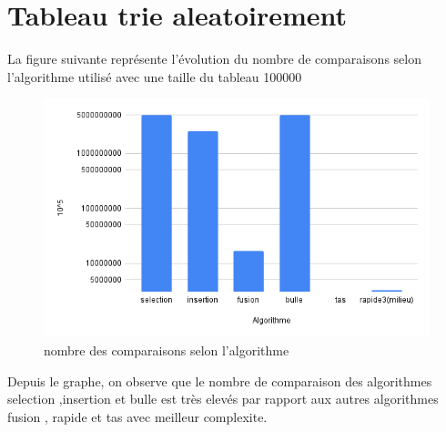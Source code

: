 \section{Tableau trie aleatoirement}
\small
\begin{center}
\end{center}
\normalsize
La figure suivante représente l’évolution du nombre de comparaisons selon l'algorithme utilisé avec une taille du tableau 100000
\begin{figure}[H]
    \centering
        \includegraphics[scale=0.7]{ressources/comaleatoire.png}
        \caption{nombre des comparaisons selon l'algorithme}
    \label{fig:temps_exec_dico_theo}
\end{figure} 
\par
Depuis le graphe, on observe que le nombre de comparaison des algorithmes selection ,insertion et bulle est très elevés par rapport aux autres algorithmes fusion , rapide et tas avec meilleur complexite. 
\normalsize


